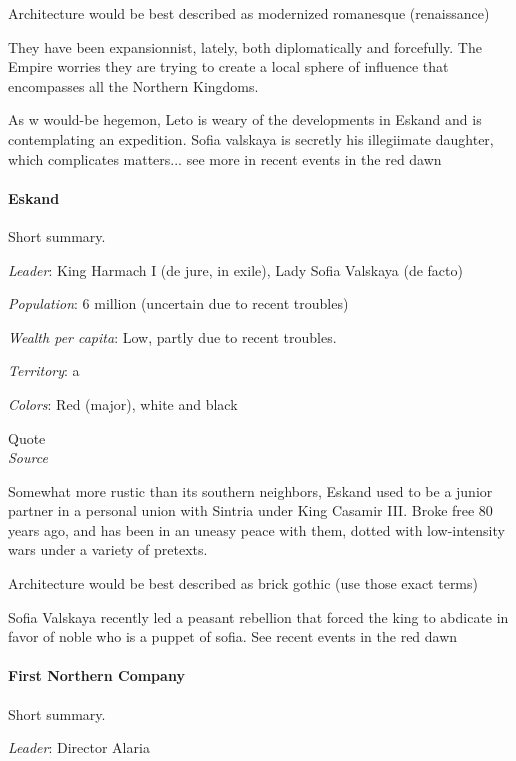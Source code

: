 Architecture would be best described as modernized romanesque (renaissance)

They have been expansionnist, lately, both diplomatically and forcefully. The Empire worries they are trying to create a local sphere of influence that encompasses all the Northern Kingdoms.

As w would-be hegemon, Leto is weary of the developments in Eskand and is contemplating an expedition.
Sofia valskaya is secretly his illegiimate daughter, which complicates matters... see more in recent events in the red dawn


\paragraph{Eskand}


Short summary.


\textit{Leader}: King Harmach I (de jure, in exile), Lady Sofia Valskaya (de facto)

\textit{Population}: 6 million (uncertain due to recent troubles)

\textit{Wealth per capita}: Low, partly due to recent troubles.

\textit{Territory}: a
    
\textit{Colors}: Red (major), white and black


\begin{rpg-quotebox}
Quote \\ \textendash \textit{Source}
\end{rpg-quotebox}


Somewhat more rustic than its southern neighbors, Eskand used to be a junior partner in a personal union with Sintria under King Casamir III. Broke free 80 years ago, and has been in an uneasy peace with them, dotted with low-intensity wars under a variety of pretexts.
    

Architecture would be best described as brick gothic (use those exact terms)



Sofia Valskaya recently led a peasant rebellion that forced the king to abdicate in favor of noble who is a puppet of sofia. See recent events in the red dawn

\paragraph{First Northern Company}


Short summary.

\textit{Leader}: Director Alaria


